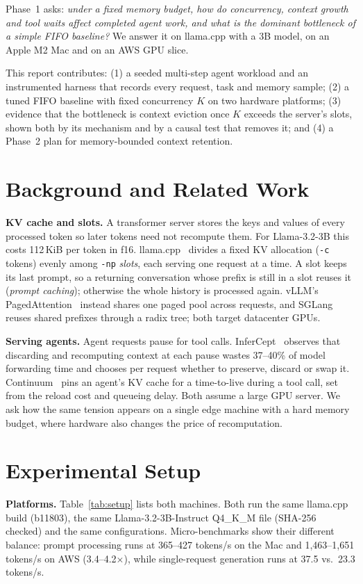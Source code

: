 \documentclass[conference,letterpaper]{IEEEtran}
\begin{document}
Phase~1 asks: \emph{under a fixed memory budget, how do concurrency, context growth and tool waits affect completed agent work, and what is the dominant bottleneck of a simple FIFO baseline?} We answer it on llama.cpp with a 3B model, on an Apple M2 Mac and on an AWS GPU slice.

This report contributes: (1) a seeded multi-step agent workload and an instrumented harness that records every request, task and memory sample; (2) a tuned FIFO baseline with fixed concurrency $K$ on two hardware platforms; (3) evidence that the bottleneck is context eviction once $K$ exceeds the server's slots, shown both by its mechanism and by a causal test that removes it; and (4) a Phase~2 plan for memory-bounded context retention.

\section{Background and Related Work}
\textbf{KV cache and slots.} A transformer server stores the keys and values of every processed token so later tokens need not recompute them. For Llama-3.2-3B this costs 112\,KiB per token in f16. llama.cpp~\cite{llamacpp} divides a fixed KV allocation (\texttt{-c} tokens) evenly among \texttt{-np} \emph{slots}, each serving one request at a time. A slot keeps its last prompt, so a returning conversation whose prefix is still in a slot reuses it (\emph{prompt caching}); otherwise the whole history is processed again. vLLM's PagedAttention~\cite{kwon2023vllm} instead shares one paged pool across requests, and SGLang~\cite{zheng2024sglang} reuses shared prefixes through a radix tree; both target datacenter GPUs.

\textbf{Serving agents.} Agent requests pause for tool calls. InferCept~\cite{abhyankar2024infercept} observes that discarding and recomputing context at each pause wastes 37--40\% of model forwarding time and chooses per request whether to preserve, discard or swap it. Continuum~\cite{li2025continuum} pins an agent's KV cache for a time-to-live during a tool call, set from the reload cost and queueing delay. Both assume a large GPU server. We ask how the same tension appears on a single edge machine with a hard memory budget, where hardware also changes the price of recomputation.

\section{Experimental Setup}
\textbf{Platforms.} Table~\ref{tab:setup} lists both machines. Both run the same llama.cpp build (b11803), the same Llama-3.2-3B-Instruct Q4\_K\_M file (SHA-256 checked) and the same configurations. Micro-benchmarks show their different balance: prompt processing runs at 365--427 tokens/s on the Mac and 1,463--1,651 tokens/s on AWS (3.4--4.2$\times$), while single-request generation runs at 37.5 vs.\ 23.3 tokens/s.
\end{document}

